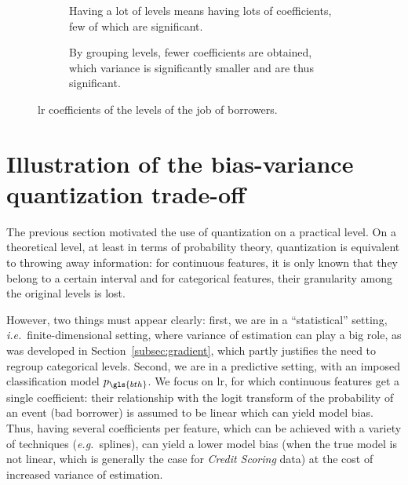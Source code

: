 \begin{figure}[!ht]
\begin{subfigure}[t]{0.5\textwidth}
\centering \resizebox{\textwidth}{!}{}
\caption{Having a lot of levels means having lots of coefficients, few of which are significant.}
\label{fig:csp_estim}
\end{subfigure}
\begin{subfigure}[t]{0.5\textwidth}
\centering \resizebox{\textwidth}{!}{}
\caption{By grouping levels, fewer coefficients are obtained, which variance is significantly smaller and are thus significant.}
\label{fig:csp_estim_disc}
\end{subfigure}
\caption{\gls{lr} coefficients of the levels of the job of borrowers.}
\label{fig:csp}
\end{figure}

\section{Illustration of the bias-variance quantization trade-off} \label{sec:bias_variance_quant}
 

The previous section motivated the use of quantization on a practical level. On a theoretical level, at least in terms of probability theory, quantization is equivalent to throwing away information: for continuous features, it is only known that they belong to a certain interval and for categorical features, their granularity among the original levels is lost.

However, two things must appear clearly: first, we are in a ``statistical'' setting, \textit{i.e.}\ finite-dimensional setting, where variance of estimation can play a big role, as was developed in Section~\ref{subsec:gradient}, which partly justifies the need to regroup categorical levels. Second, we are in a predictive setting, with an imposed classification model $p_{\gls{bth}}$. We focus on \gls{lr}, for which continuous features get a single coefficient: their relationship with the logit transform of the probability of an event (bad borrower) is assumed to be linear which can yield model bias. Thus, having several coefficients per feature, which can be achieved with a  variety of techniques (\textit{e.g.}\ splines), can yield a lower model bias (when the true model is not linear, which is generally the case for \textit{Credit Scoring} data) at the cost of increased variance of estimation.

